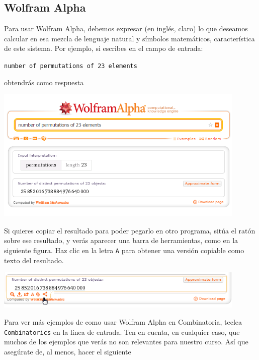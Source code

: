 \documentclass[10pt,a4paper]{article}\usepackage[]{graphicx}\usepackage[]{color}
\begin{document}
\subsection{Wolfram Alpha}
\label{tut03:subsec:CombinatoriaWolframAlpha}

Para usar Wolfram Alpha, debemos expresar (en inglés, claro) lo que deseamos calcular en esa mezcla de lenguaje natural y símbolos matemáticos, característica de este sistema. Por ejemplo, si escribes en el campo de entrada:
\begin{center}
    {\tt number of permutations of 23 elements}
\end{center}
obtendrás como respuesta
    \begin{center}
    \includegraphics[width=12cm]{../fig/Tut05-08.png}
    \end{center}
Si quieres copiar el resultado para poder pegarlo en otro programa, sitúa el ratón sobre ese resultado, y verás aparecer una barra de herramientas, como en la siguiente figura. Haz clic en la letra {\tt A} para obtener una versión copiable como texto del resultado.
    \begin{center}
    \includegraphics[width=12cm]{../fig/Tut05-09.png}
    \end{center}
Para ver más ejemplos de como usar Wolfram Alpha en Combinatoria, teclea {\tt Combinatorics} en la línea de entrada. Ten en cuenta, en cualquier caso, que muchos de los ejemplos que verás no son relevantes para nuestro curso. Así que asegúrate de, al menos, hacer el siguiente
\end{document}
